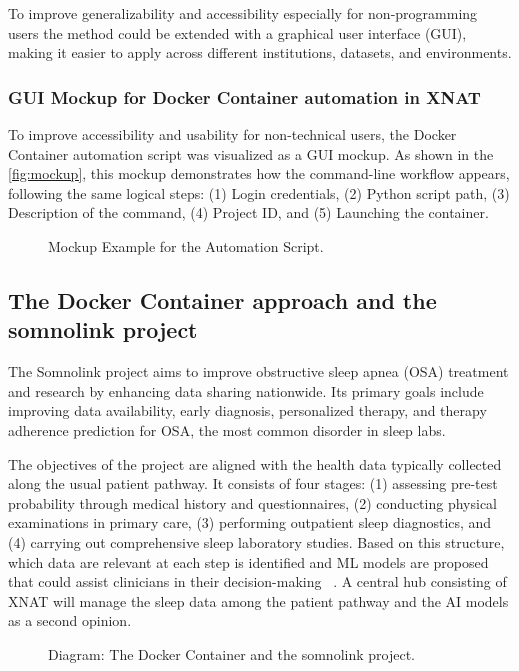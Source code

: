 To improve generalizability and accessibility especially for non-programming users the method could be extended with a graphical user interface (GUI), making it easier to apply across different institutions, datasets, and environments. 
\normalsize
\subsubsection{GUI Mockup for Docker Container automation in XNAT}
\normalsize
To improve accessibility and usability for non-technical users, the Docker Container  automation script was visualized as a GUI mockup. As shown in the \autoref{fig:mockup}, this mockup demonstrates how the command-line workflow appears, following the same logical steps: (1) Login credentials, (2) Python script path, (3) Description of the command, (4) Project ID, and (5) Launching the container.
\normalsize
\begin{figure}[H]
    \centering
    \def\svgwidth{\linewidth} 
    
    \caption{ Mockup Example for the Automation Script.}
    \label{fig:mockup}
\end{figure}
\normalsize
\subsection{The Docker Container approach and the somnolink project}

The Somnolink project aims to improve obstructive sleep apnea (OSA) treatment and research by enhancing data sharing nationwide. Its primary goals include improving data availability, early diagnosis, personalized therapy, and therapy adherence prediction for OSA, the most common disorder in sleep labs.

The objectives of the project are aligned with the health data typically collected along the usual patient pathway. It consists of four stages: (1) assessing pre-test probability through medical history and questionnaires, (2) conducting physical examinations in primary care, (3) performing outpatient sleep diagnostics, and (4) carrying out comprehensive sleep laboratory studies. Based on this structure, which data are relevant at each step is identified and ML models are proposed that could assist clinicians in their decision-making ~\cite{krefting_somnolink_2025}. A central hub consisting of XNAT will manage the sleep data among the patient pathway and the AI models as a second opinion.
\begin{figure}[H]
    \centering
    \def\svgwidth{\linewidth} 
    
    \caption{Diagram: The Docker Container and the somnolink project.}
    \label{fig:somnolink}
\end{figure}

